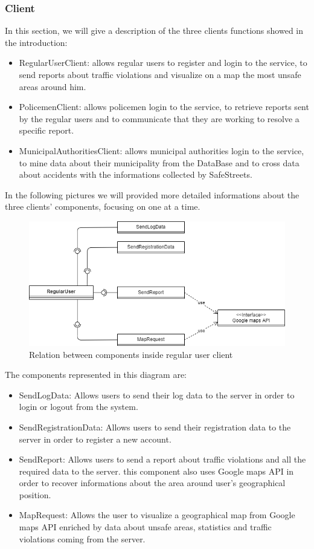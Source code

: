 \subsubsection{Client}
In this section, we will give a description of the three clients functions showed in the introduction:
\begin{itemize}
	\item RegularUserClient: allows regular users to register and login to the service, to send reports about traffic violations and visualize on a map the most unsafe areas around him.
	\item PolicemenClient: allows policemen login to the service, to retrieve reports sent by the regular users and to communicate that they are working to resolve a specific report.
	\item MunicipalAuthoritiesClient: allows municipal authorities login to the service, to mine data about their municipality from the DataBase and to cross data about accidents with the informations collected by SafeStreets.
\end{itemize}
In the following pictures we will provided more detailed informations about the three clients' components, focusing on one at a time.

\begin{figure}[h!]
	\centering
	\includegraphics[scale=0.7]{Images/RegularUserClient}
	\caption{Relation between components inside regular user client}
\end{figure}
The components represented in this diagram are:
\begin{itemize}
	\item SendLogData: Allows users to send their log data to the server in order to login or logout from the system.
	\item SendRegistrationData: Allows users to send  their registration data to the server in order to register a new account.
	\item SendReport: Allows users to send a report about traffic violations and all the required data to the server.
	this component also uses Google maps API in order to recover informations about the area around user's geographical position.
	\item MapRequest: Allows the user to visualize a geographical map from Google maps API enriched by data about unsafe areas, statistics and traffic violations coming from the server.
\end{itemize}

